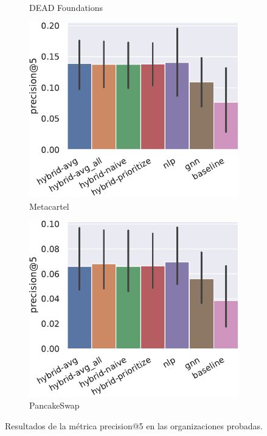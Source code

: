 \begin{figure}[t]
\begin{subfigure}{.24\linewidth}
        \caption{DEAD Foundations}
        \label{fig:all-results-precision-dead_foundations}
    \end{subfigure}\hfill\begin{subfigure}{.24\linewidth}
        \includegraphics[width=\linewidth]{figures/resultados/7_all-metrics-MetaCartel - MetaCartel Ventures-precision@5.pdf}
        \caption{Metacartel}
    \end{subfigure}\hfill\begin{subfigure}{.24\linewidth}
        \includegraphics[width=\linewidth]{figures/resultados/7_all-metrics-PancakeSwap-precision@5.pdf}
        \caption{PancakeSwap}
    \end{subfigure}
    \caption{Resultados de la métrica precision@5 en las organizaciones probadas.}
    \label{fig:all-results-precision}
\end{figure}

